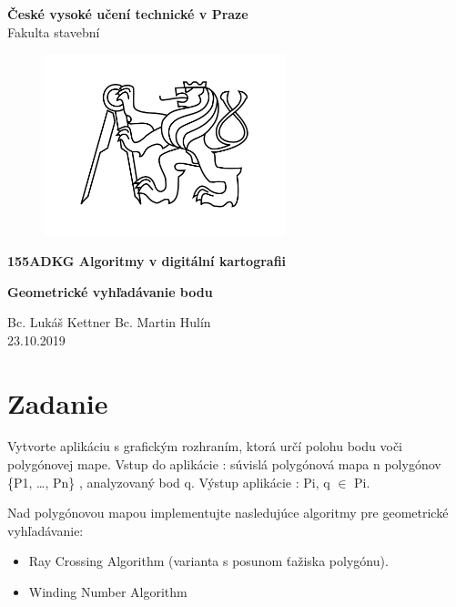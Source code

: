 \documentclass[12pt]{article}
\begin{document}
\begin{titlepage}
\centering
\Large \textbf{České vysoké učení technické v Praze }\\ Fakulta stavební
\vspace{2cm}

\begin{figure}[h!] %
\centering
\includegraphics[width=7cm]{./img/cvut.png}
\end{figure}
 
\Large \textbf{155ADKG Algoritmy v digitální kartografii}
\vspace{1cm}

\LARGE  \textbf{Geometrické vyhľadávanie bodu}
\vspace{3cm}

\Large Bc. Lukáš Kettner Bc. Martin Hulín \\ 23.10.2019

 \thispagestyle{empty} %
\end{titlepage}

\tableofcontents    %
\newpage %
\section{Zadanie}
Vytvorte aplikáciu s grafickým rozhraním, ktorá určí polohu bodu voči polygónovej mape. Vstup do aplikácie : súvislá polygónová mapa n polygónov \{P1, …, Pn\} , analyzovaný bod q. Výstup aplikácie : Pi, q $\in$ Pi.

Nad polygónovou mapou implementujte nasledujúce algoritmy pre geometrické vyhľadávanie:

\begin{itemize}
\item Ray Crossing Algorithm (varianta s posunom ťažiska polygónu).
\item Winding Number Algorithm	
\end{itemize}
		
\end{document}
